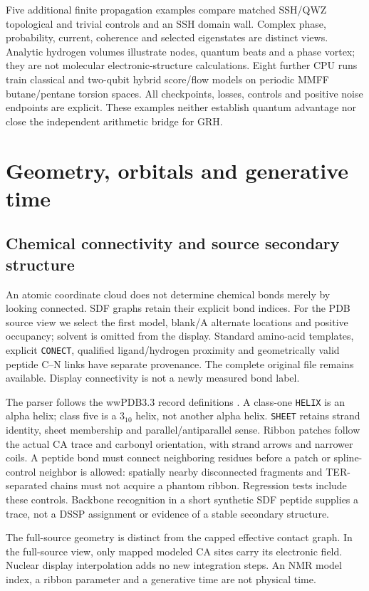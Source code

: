 \documentclass[11pt]{article}
\theoremstyle{definition}\newtheorem{definition}[theorem]{Definition}
\theoremstyle{remark}\newtheorem{remark}[theorem]{Remark}
\begin{document}
Five additional finite propagation examples compare matched SSH/QWZ
topological and trivial controls and an SSH domain wall. Complex phase,
probability, current, coherence and selected eigenstates are distinct views.
Analytic hydrogen volumes illustrate nodes, quantum beats and a phase vortex;
they are not molecular electronic-structure calculations. Eight further CPU
runs train classical and two-qubit hybrid score/flow models on periodic MMFF
butane/pentane torsion spaces. All checkpoints, losses, controls and positive
noise endpoints are explicit. These examples neither establish quantum
advantage nor close the independent arithmetic bridge for GRH.

\section{Geometry, orbitals and generative time}
\subsection{Chemical connectivity and source secondary structure}
An atomic coordinate cloud does not determine chemical bonds merely by
looking connected. SDF graphs retain their explicit bond indices. For the PDB
source view we select the first model, blank/A alternate locations and positive
occupancy; solvent is omitted from the display. Standard amino-acid templates,
explicit \texttt{CONECT}, qualified ligand/hydrogen proximity and geometrically
valid peptide C--N links have separate provenance. The complete original file
remains available. Display connectivity is not a newly measured bond label.

The parser follows the wwPDB3.3 record definitions \cite{VisPDB}. A class-one
\texttt{HELIX} is an alpha helix; class five is a $3_{10}$ helix, not another
alpha helix. \texttt{SHEET} retains strand identity, sheet membership and
parallel/antiparallel sense. Ribbon patches follow the actual CA trace and
carbonyl orientation, with strand arrows and narrower coils. A peptide bond
must connect neighboring residues before a patch or spline-control neighbor
is allowed: spatially nearby disconnected fragments and TER-separated chains
must not acquire a phantom ribbon. Regression tests include these controls.
Backbone recognition in a short synthetic SDF peptide supplies a trace, not a
DSSP assignment or evidence of a stable secondary structure.

The full-source geometry is distinct from the capped effective contact graph.
In the full-source view, only mapped modeled CA sites carry its electronic
field. Nuclear display interpolation adds no new integration steps. An NMR
model index, a ribbon parameter and a generative time are not physical time.
\end{document}
